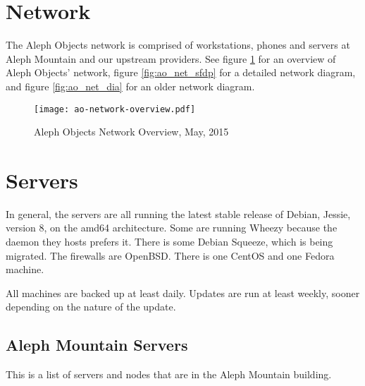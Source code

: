 %
%
%
%
%

\section{Network}
The Aleph Objects network is comprised of workstations, phones and servers at
Aleph Mountain and our upstream providers. See figure
\ref{fig:ao_net_overview} for an overview of Aleph Objects' network,
figure \ref{fig:ao_net_sfdp} for a detailed network diagram, and
figure \ref{fig:ao_net_dia} for an older network diagram.

\begin{figure}[h!]
\texttt{[image: ao-network-overview.pdf]}
 \caption{Aleph Objects Network Overview, May, 2015}
 \label{fig:ao_net_overview}
\end{figure}

\section{Servers}
In general, the servers are all running the latest stable release of Debian,
Jessie, version 8, on the amd64 architecture. Some are running Wheezy because
the daemon they hosts prefers it. There is some Debian Squeeze, which is being
migrated. The firewalls are OpenBSD. There is one CentOS and one Fedora
machine.

All machines are backed up at least daily. Updates are run at least weekly,
sooner depending on the nature of the update.

\subsection{Aleph Mountain Servers}
This is a list of servers and nodes that are in the Aleph Mountain building.

